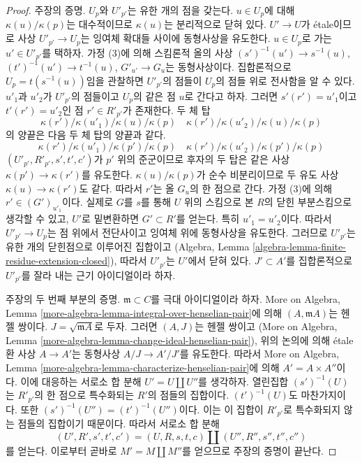 \begin{proof}
\medskip\noindent
주장의 증명. $U_p$와 $U'_{p'}$는 유한 개의 점을 갖는다. $u \in U_p$에 대해 $\kappa(u)/\kappa(p)$는 대수적이므로
$\kappa(u)$는 분리적으로 닫혀 있다. $U' \to U$가 \'etale이므로 사상 $U'_{p'} \to U_p$는 잉여체 확대들 사이에
동형사상을 유도한다. $u \in U_p$로 가는 $u' \in U'_{p'}$를 택하자. 가정 (3)에 의해 스킴론적 올의 사상
$(s')^{-1}(u') \to s^{-1}(u)$, $(t')^{-1}(u') \to t^{-1}(u)$, $G'_{u'} \to G_u$는 동형사상이다.
집합론적으로 $U_p = t(s^{-1}(u))$임을 관찰하면 $U'_{p'}$의 점들이 $U_p$의 점들 위로 전사함을 알 수 있다.
$u'_1$과 $u'_2$가 $U'_{p'}$의 점들이고 $U_p$의 같은 점 $u$로 간다고 하자. 그러면
$s'(r') = u'_1$이고 $t'(r') = u'_2$인 점 $r' \in R'_{p'}$가 존재한다. 두 체 탑
$$
\kappa(r')/\kappa(u'_1)/\kappa(u)/\kappa(p) \quad
\kappa(r')/\kappa(u'_2)/\kappa(u)/\kappa(p)
$$
의 양끝은 다음 두 체 탑의 양끝과 같다.
$$
\kappa(r')/\kappa(u'_1)/\kappa(p')/\kappa(p) \quad
\kappa(r')/\kappa(u'_2)/\kappa(p')/\kappa(p)
$$
$(U'_{p'}, R'_{p'}, s', t', c')$가 $p'$ 위의 준군이므로 후자의 두 탑은 같은 사상
$\kappa(p') \to \kappa(r')$를 유도한다. $\kappa(u)/\kappa(p)$가 순수 비분리이므로 두 유도 사상
$\kappa(u) \to \kappa(r')$도 같다. 따라서 $r'$는 올 $G_u$의 한 점으로 간다. 가정 (3)에 의해
$r' \in (G')_{u'_1}$이다. 실제로 $G$를 $s$를 통해 $U$ 위의 스킴으로 본 $R$의 닫힌 부분스킴으로 생각할 수 있고,
$U'$로 밑변환하면 $G' \subset R'$를 얻는다. 특히 $u'_1 = u'_2$이다. 따라서 $U'_{p'} \to U_p$는 점 위에서
전단사이고 잉여체 위에 동형사상을 유도한다. 그러므로 $U'_{p'}$는 유한 개의 닫힌점으로 이루어진 집합이고
(Algebra, Lemma \ref{algebra-lemma-finite-residue-extension-closed}), 따라서 $U'_{p'}$는 $U'$에서 닫혀 있다.
$J' \subset A'$를 집합론적으로 $U'_{p'}$를 잘라 내는 근기 아이디얼이라 하자.

\medskip\noindent
주장의 두 번째 부분의 증명. $\mathfrak m \subset C$를 극대 아이디얼이라 하자.
More on Algebra, Lemma \ref{more-algebra-lemma-integral-over-henselian-pair}에 의해
$(A, \mathfrak m A)$는 헨젤 쌍이다. $J = \sqrt{\mathfrak m A}$로 두자. 그러면 $(A, J)$는 헨젤 쌍이고
(More on Algebra, Lemma \ref{more-algebra-lemma-change-ideal-henselian-pair}), 위의 논의에 의해 \'etale 환 사상
$A \to A'$는 동형사상 $A/J \to A'/J'$를 유도한다. 따라서 More on Algebra,
Lemma \ref{more-algebra-lemma-characterize-henselian-pair}에 의해 $A' = A \times A''$이다.
이에 대응하는 서로소 합 분해 $U' = U \amalg U''$를 생각하자. 열린집합 $(s')^{-1}(U)$는 $R'_{p'}$의 한 점으로
특수화되는 $R'$의 점들의 집합이다. $(t')^{-1}(U)$도 마찬가지이다. 또한
$(s')^{-1}(U'') = (t')^{-1}(U'')$이다. 이는 이 집합이 $R'_{p'}$로 특수화되지 않는 점들의 집합이기 때문이다.
따라서 서로소 합 분해
$$
(U', R', s', t', c') =
(U, R, s, t, c) \amalg
(U'', R'', s'', t'', c'')
$$
를 얻는다. 이로부터 곧바로 $M' = M \amalg M''$를 얻으므로 주장의 증명이 끝난다.


\end{proof}

